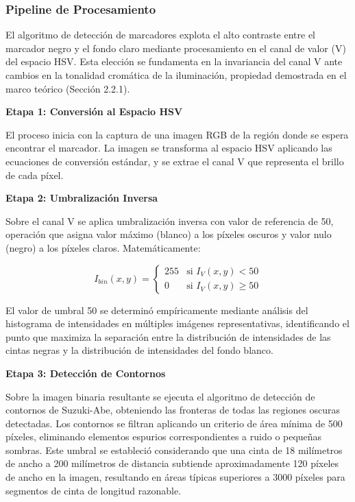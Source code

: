 \subsubsection{Pipeline de Procesamiento}

El algoritmo de detección de marcadores explota el alto contraste entre el marcador negro y el fondo claro mediante procesamiento en el canal de valor (V) del espacio HSV. Esta elección se fundamenta en la invariancia del canal V ante cambios en la tonalidad cromática de la iluminación, propiedad demostrada en el marco teórico (Sección 2.2.1).

\textbf{Etapa 1: Conversión al Espacio HSV}

El proceso inicia con la captura de una imagen RGB de la región donde se espera encontrar el marcador. La imagen se transforma al espacio HSV aplicando las ecuaciones de conversión estándar, y se extrae el canal V que representa el brillo de cada píxel.

\textbf{Etapa 2: Umbralización Inversa}

Sobre el canal V se aplica umbralización inversa con valor de referencia de 50, operación que asigna valor máximo (blanco) a los píxeles oscuros y valor nulo (negro) a los píxeles claros. Matemáticamente:

\begin{equation}
I_{bin}(x,y) = \begin{cases}
255 & \text{si } I_V(x,y) < 50 \\
0 & \text{si } I_V(x,y) \geq 50
\end{cases}
\end{equation}

El valor de umbral 50 se determinó empíricamente mediante análisis del histograma de intensidades en múltiples imágenes representativas, identificando el punto que maximiza la separación entre la distribución de intensidades de las cintas negras y la distribución de intensidades del fondo blanco.

\textbf{Etapa 3: Detección de Contornos}

Sobre la imagen binaria resultante se ejecuta el algoritmo de detección de contornos de Suzuki-Abe, obteniendo las fronteras de todas las regiones oscuras detectadas. Los contornos se filtran aplicando un criterio de área mínima de 500 píxeles, eliminando elementos espurios correspondientes a ruido o pequeñas sombras. Este umbral se estableció considerando que una cinta de 18 milímetros de ancho a 200 milímetros de distancia subtiende aproximadamente 120 píxeles de ancho en la imagen, resultando en áreas típicas superiores a 3000 píxeles para segmentos de cinta de longitud razonable.

